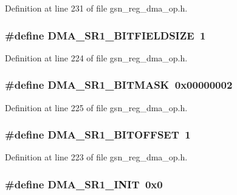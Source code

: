 Definition at line 231 of file gsn\_\-reg\_\-dma\_\-op.h.

\hypertarget{a00547_aa887312016f95805db5303802fc00992}{
\subsubsection[{DMA\_\-SR1\_\-BITFIELDSIZE}]{\setlength{\rightskip}{0pt plus 5cm}\#define DMA\_\-SR1\_\-BITFIELDSIZE~1}}
\label{a00547_aa887312016f95805db5303802fc00992}


Definition at line 224 of file gsn\_\-reg\_\-dma\_\-op.h.

\hypertarget{a00547_a4fdaa0cb47057b0f86f4557acb74d498}{
\subsubsection[{DMA\_\-SR1\_\-BITMASK}]{\setlength{\rightskip}{0pt plus 5cm}\#define DMA\_\-SR1\_\-BITMASK~0x00000002}}
\label{a00547_a4fdaa0cb47057b0f86f4557acb74d498}


Definition at line 225 of file gsn\_\-reg\_\-dma\_\-op.h.

\hypertarget{a00547_a006e4b58517a5dceeb10c5c8dcb43443}{
\subsubsection[{DMA\_\-SR1\_\-BITOFFSET}]{\setlength{\rightskip}{0pt plus 5cm}\#define DMA\_\-SR1\_\-BITOFFSET~1}}
\label{a00547_a006e4b58517a5dceeb10c5c8dcb43443}


Definition at line 223 of file gsn\_\-reg\_\-dma\_\-op.h.

\hypertarget{a00547_a31b34fd5f312ae07fac98416c94975cb}{
\subsubsection[{DMA\_\-SR1\_\-INIT}]{\setlength{\rightskip}{0pt plus 5cm}\#define DMA\_\-SR1\_\-INIT~0x0}}
\label{a00547_a31b34fd5f312ae07fac98416c94975cb}


